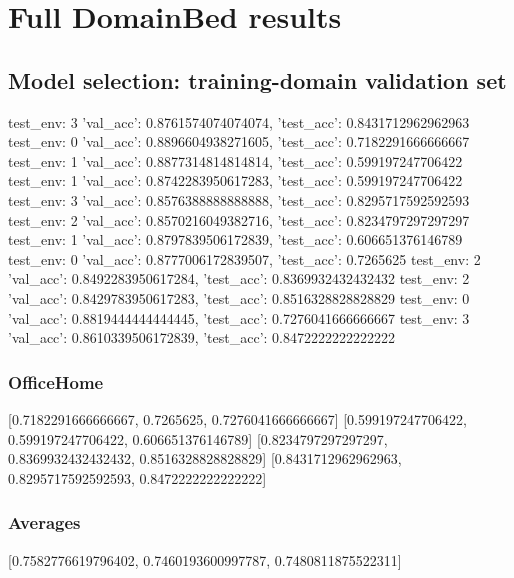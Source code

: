 \documentclass{article}
\begin{document}
\section{Full DomainBed results}

\subsection{Model selection: training-domain validation set}
test_env: 3
{'val_acc': 0.8761574074074074, 'test_acc': 0.8431712962962963}
test_env: 0
{'val_acc': 0.8896604938271605, 'test_acc': 0.7182291666666667}
test_env: 1
{'val_acc': 0.8877314814814814, 'test_acc': 0.599197247706422}
test_env: 1
{'val_acc': 0.8742283950617283, 'test_acc': 0.599197247706422}
test_env: 3
{'val_acc': 0.8576388888888888, 'test_acc': 0.8295717592592593}
test_env: 2
{'val_acc': 0.8570216049382716, 'test_acc': 0.8234797297297297}
test_env: 1
{'val_acc': 0.8797839506172839, 'test_acc': 0.606651376146789}
test_env: 0
{'val_acc': 0.8777006172839507, 'test_acc': 0.7265625}
test_env: 2
{'val_acc': 0.8492283950617284, 'test_acc': 0.8369932432432432}
test_env: 2
{'val_acc': 0.8429783950617283, 'test_acc': 0.8516328828828829}
test_env: 0
{'val_acc': 0.8819444444444445, 'test_acc': 0.7276041666666667}
test_env: 3
{'val_acc': 0.8610339506172839, 'test_acc': 0.8472222222222222}

\subsubsection{OfficeHome}
[0.7182291666666667, 0.7265625, 0.7276041666666667]
[0.599197247706422, 0.599197247706422, 0.606651376146789]
[0.8234797297297297, 0.8369932432432432, 0.8516328828828829]
[0.8431712962962963, 0.8295717592592593, 0.8472222222222222]

\begin{center}
\end{center}

\subsubsection{Averages}
[0.7582776619796402, 0.7460193600997787, 0.7480811875522311]

\begin{center}
\end{center}
\end{document}
